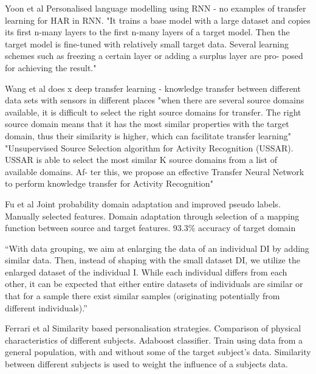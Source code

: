 Yoon et al
Personalised language modelling using RNN - no examples of transfer learning for HAR in RNN. "It trains a base model with a large dataset and copies its first n-many layers to the first n-many layers of a target model. Then the target model is fine-tuned with relatively small target data. Several learning schemes such as freezing a certain layer or adding a surplus layer are pro- posed for achieving the result."\cite{Yoon2017}

Wang et al does x
deep transfer learning - knowledge transfer between different data sets with sensors in different places\cite{Wang2018a} "when there are several source domains available, it is difficult to select the right source domains for transfer. The right source domain means that it has the most similar properties with the target domain, thus their similarity is higher, which can facilitate transfer learning" "Unsupervised Source Selection algorithm for Activity Recognition (USSAR). USSAR is able to select the most similar K source domains from a list of available domains. Af- ter this, we propose an effective Transfer Neural Network to perform knowledge transfer for Activity Recognition"

Fu et al
Joint probability domain adaptation and improved pseudo labels\cite{Fu2021}. Manually selected features. Domain adaptation through selection of a mapping function between source and target features. 93.3\% accuracy of target domain


``With data grouping, we aim at enlarging the data of an individual DI by adding similar data. Then, instead of shaping with the small dataset DI, we utilize the enlarged dataset of the individual I. While each individual differs from each other, it can be expected that either entire datasets of individuals are similar or that for a sample there exist similar samples (originating potentially from different individuals).''\cite{Schneider2021}

Ferrari et al
Similarity based personalisation strategies. Comparison of physical characteristics of different subjects\cite{Ferrari2020}. Adaboost classifier. Train using data from a general population, with and without some of the target subject's data. Similarity between different subjects is used to weight the influence of a subjects data.

